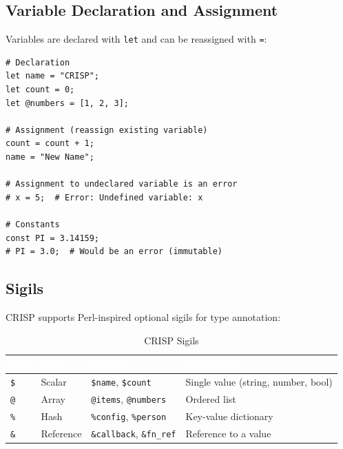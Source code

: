 \subsection{Variable Declaration and Assignment}

Variables are declared with \texttt{let} and can be reassigned with \texttt{=}:

\begin{tcolorbox}[colback=codebg, colframe=darkpurple, colbacktitle=darkpurple, title=\textbf{\textcolor{codegold}{Variable Declaration and Assignment}}, fonttitle=\bfseries, sharp corners]
\begin{lstlisting}
# Declaration
let name = "CRISP";
let count = 0;
let @numbers = [1, 2, 3];

# Assignment (reassign existing variable)
count = count + 1;
name = "New Name";

# Assignment to undeclared variable is an error
# x = 5;  # Error: Undefined variable: x

# Constants
const PI = 3.14159;
# PI = 3.0;  # Would be an error (immutable)
\end{lstlisting}
\end{tcolorbox}

\subsection{Sigils}

CRISP supports Perl-inspired optional sigils for type annotation:

\begin{table}[H]
\centering
{}
\caption{\textcolor{darkpurple}{CRISP Sigils}}
\vspace{0.3em}
\begin{tabular}{@{}lllp{5cm}@{}}
\toprule
\rowcolor{softvioletdark}
\textbf{\textcolor{white}{Sigil}} & \textbf{\textcolor{white}{Name}} & \textbf{\textcolor{white}{Example}} & \textbf{\textcolor{white}{Description}} \\
\midrule
\texttt{\$} & Scalar & \texttt{\$name}, \texttt{\$count} & Single value (string, number, bool) \\
\texttt{@} & Array & \texttt{@items}, \texttt{@numbers} & Ordered list \\
\texttt{\%} & Hash & \texttt{\%config}, \texttt{\%person} & Key-value dictionary \\
\texttt{\&} & Reference & \texttt{\&callback}, \texttt{\&fn\_ref} & Reference to a value \\
\bottomrule
\end{tabular}
\end{table}

